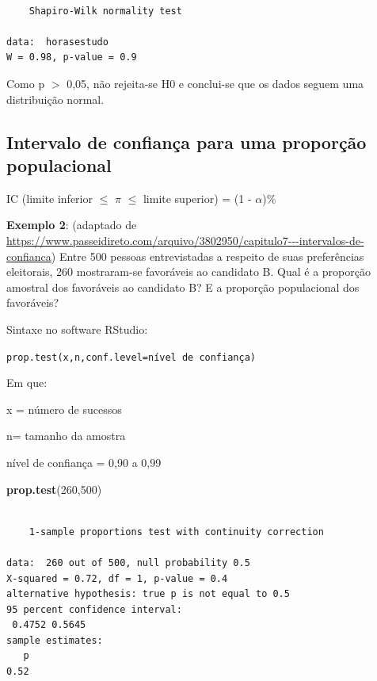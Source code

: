 \documentclass[12pt,brazil,oneside]{book}
\newenvironment{Shaded}{\begin{snugshade}}{\end{snugshade}}
\newcommand{\DecValTok}[1]{\textcolor[rgb]{0.00,0.00,0.81}{#1}}
\newcommand{\KeywordTok}[1]{\textcolor[rgb]{0.13,0.29,0.53}{\textbf{#1}}}
\newcommand{\NormalTok}[1]{#1}
\begin{document}
\begin{verbatim}

    Shapiro-Wilk normality test

data:  horasestudo
W = 0.98, p-value = 0.9
\end{verbatim}

Como p \(>\) 0,05, não rejeita-se H0 e conclui-se que os dados seguem
uma distribuição normal.

\hypertarget{intervalo-de-confianca-para-uma-proporcao-populacional}{%
\subsection{Intervalo de confiança para uma proporção
populacional}\label{intervalo-de-confianca-para-uma-proporcao-populacional}}

IC (limite inferior \(\leq\) \(\pi\) \(\leq\) limite superior) = (1 -
\(\alpha\))\%

\textbf{Exemplo 2}: (adaptado de
\url{https://www.passeidireto.com/arquivo/3802950/capitulo7---intervalos-de-confianca})
Entre 500 pessoas entrevistadas a respeito de suas preferências
eleitorais, 260 mostraram-se favoráveis ao candidato B. Qual é a
proporção amostral dos favoráveis ao candidato B? E a proporção
populacional dos favoráveis?

Sintaxe no software RStudio:

\texttt{prop.test(x,n,conf.level=nível\ de\ confiança)}

Em que:

x = número de sucessos

n= tamanho da amostra

nível de confiança = 0,90 a 0,99

\begin{Shaded}
\begin{Highlighting}[]
\KeywordTok{prop.test}\NormalTok{(}\DecValTok{260}\NormalTok{,}\DecValTok{500}\NormalTok{)}
\end{Highlighting}
\end{Shaded}

\begin{verbatim}

    1-sample proportions test with continuity correction

data:  260 out of 500, null probability 0.5
X-squared = 0.72, df = 1, p-value = 0.4
alternative hypothesis: true p is not equal to 0.5
95 percent confidence interval:
 0.4752 0.5645
sample estimates:
   p 
0.52 
\end{verbatim}
\end{document}
